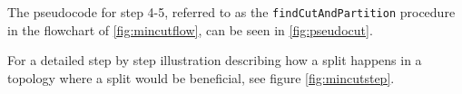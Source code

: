 The pseudocode for step 4-5, referred to as the \verb|findCutAndPartition| procedure in the flowchart of \ref{fig:mincutflow}, can be seen in \ref{fig:pseudocut}.  

For a detailed step by step illustration describing how a split happens in a topology where a split would be beneficial, see figure \ref{fig:mincutstep}. 
\begin{figure}
	\centering
		\qquad
		

\end{figure}
